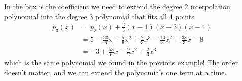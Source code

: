 {\begin{figure}[H]
\begin{tabular}{ll|lll}
\end{tabular}
\end{figure}
In the box is the coefficient we need to extend the degree 2 interpolation polynomial into the degree 3 polynomial that fits all 4 points
\begin{align*}
p_3(x) &= p_2(x) + \frac{2}{3}(x-1)(x-3)(x-4) \\
&= 5 - \frac{23}{6}x + \frac{5}{6}x^2 + \frac{2}{3}x^3 - \frac{16}{3}x^2 + \frac{38}{3}x - 8\\
&= -3 + \frac{53}{6}x - \frac{9}{2}x^2 + \frac{2}{3}x^3
\end{align*}
which is the same polynomial we found in the previous example! The order doesn't matter, and we can extend the polynomials one term at a time.
}{\downline}



